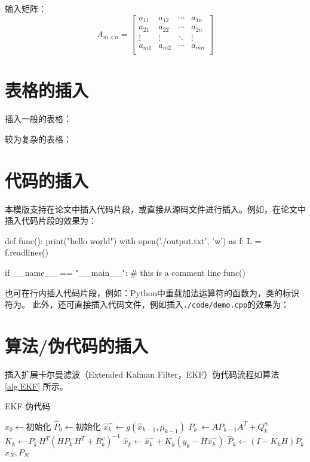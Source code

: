 输入矩阵：
\begin{equation}
	\label{eqn:matrix}
	A_{m\times n}=
	\left[ {\begin{array}{cccc}
			a_{11} & a_{12} & \cdots & a_{1n}\\
			a_{21} & a_{22} & \cdots & a_{2n}\\
			\vdots & \vdots & \ddots & \vdots\\
			a_{m1} & a_{m2} & \cdots & a_{mn}\\
	\end{array}}\right]
\end{equation}

\section{表格的插入}
\label{sec:table}
插入一般的表格：


较为复杂的表格：


\section{代码的插入}
\label{sec:code}
本模版支持在论文中插入代码片段，或直接从源码文件进行插入。例如，在论文中插入代码片段的效果为：
\begin{python}
def func():
print("hello world")
with open('./output.txt', 'w') as f:
L = f.readlines()
	
if __name__ == "__main__":
# this is a comment line
func()
\end{python}
也可在行内插入代码片段，例如：Python中重载加法运算符的函数为，类的标识符为。
此外，还可直接插入代码文件，例如插入\texttt{./code/demo.cpp}的效果为：


\section{算法/伪代码的插入}
插入扩展卡尔曼滤波（Extended Kalman Filter，EKF）伪代码流程如算法 \ref{alg.EKF} 所示。
\begin{algorithm}[H]
    \small
    \caption{EKF 伪代码}
    \label{alg.EKF}
    \begin{algorithmic}[htbp]
        \Statex
        \State $\hat{x}_{0} \gets \text{初始化}$
        \State $\hat{P}_{0} \gets \text{初始化}$
        \State $ \hat{x}_{k}^{-} \gets g(\hat{x}_{k-1},\mu _{k-1})$
        \State $ P_{k}^{-} \gets A P_{k-1} A^T + Q^w_k $
        \State $ K_k \gets P_{k}^{-} H^T ( H P_{k}^{-} H^T + R^v_k )^{-1} $
        \State $ \hat{x}_k \gets \hat{x}_{k}^{-} + K_k\left( y_k - H \hat{x}_{k}^{-} \right) $
        \State $ \hat{P}_k \gets \left( I - K_k H \right) P_{k}^{-} $
        \EndFor
        \State \Return $ \hat{x}_N, P_N $
        \EndFunction
    \end{algorithmic}
\end{algorithm}